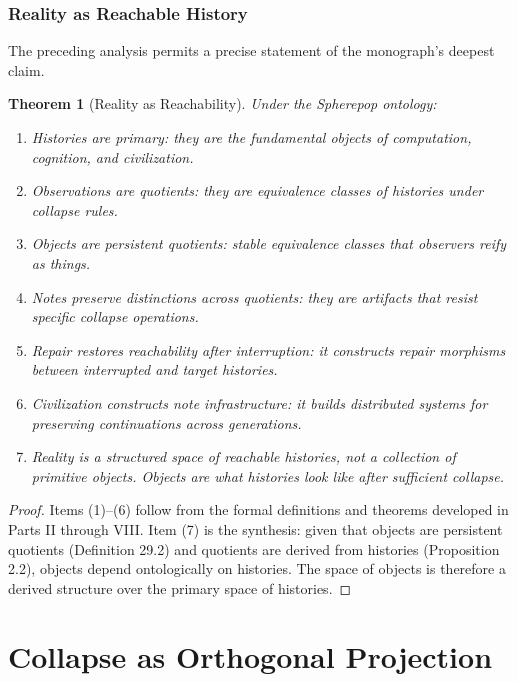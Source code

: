 \documentclass[12pt, a4paper, openany]{book}
\theoremstyle{plain}
\newtheorem{theorem}{Theorem}[chapter]
\theoremstyle{definition}
\theoremstyle{remark}
\begin{document}
\section{Reality as Reachable History}

The preceding analysis permits a precise statement of the monograph's deepest claim.

\begin{theorem}[Reality as Reachability]
Under the Spherepop ontology:
\begin{enumerate}
\item Histories are primary: they are the fundamental objects of computation, cognition, and civilization.
\item Observations are quotients: they are equivalence classes of histories under collapse rules.
\item Objects are persistent quotients: stable equivalence classes that observers reify as things.
\item Notes preserve distinctions across quotients: they are artifacts that resist specific collapse operations.
\item Repair restores reachability after interruption: it constructs repair morphisms between interrupted and target histories.
\item Civilization constructs note infrastructure: it builds distributed systems for preserving continuations across generations.
\item Reality is a structured space of reachable histories, not a collection of primitive objects. Objects are what histories look like after sufficient collapse. 
\end{enumerate}
\end{theorem}

\begin{proof}
Items (1)--(6) follow from the formal definitions and theorems developed in
Parts II through VIII. Item (7) is the synthesis: given that objects are
persistent quotients (Definition 29.2) and quotients are derived from histories
(Proposition 2.2), objects depend ontologically on histories. The space of
objects is therefore a derived structure over the primary space of histories.
\end{proof}

\part{Collapse as Orthogonal Projection}
\end{document}
